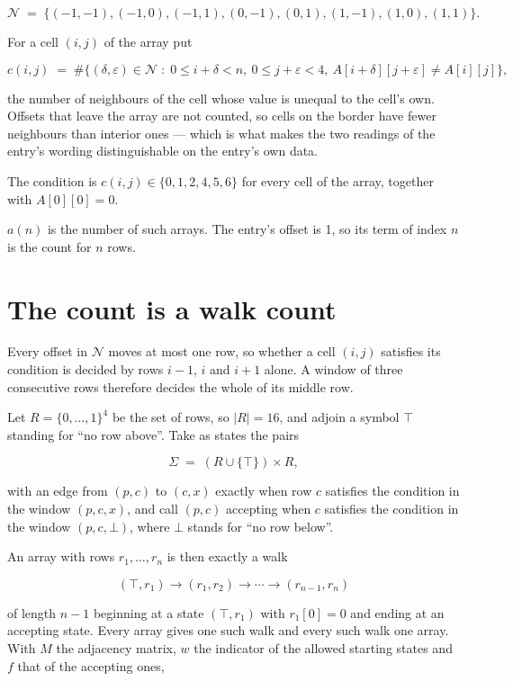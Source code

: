 \documentclass[11pt]{article}
\theoremstyle{definition}
\begin{document}
\[\mathcal{N} \;=\; \{(-1,-1), (-1,0), (-1,1), (0,-1), (0,1), (1,-1), (1,0), (1,1)\}.\]

For a cell $(i,j)$ of the array put

\[c(i,j) \;=\; \#\bigl\{(\delta,\varepsilon)\in\mathcal{N} \;:\; 0\le i+\delta<n,\ 0\le j+\varepsilon<4,\ A[i+\delta][j+\varepsilon] \neq A[i][j]\bigr\},\]

the number of neighbours of the cell whose value is unequal to the cell's own. Offsets that leave the array are not counted, so cells on the border have fewer neighbours than interior ones --- which is what makes the two readings of the entry's wording distinguishable on the entry's own data.

The condition is $c(i,j) \in \{0, 1, 2, 4, 5, 6\}$ for every cell of the array, together with $A[0][0]=0$.

$a(n)$ is the number of such arrays. The entry's offset is 1, so its term of index $n$ is the count for $n$ rows.

\section{The count is a walk count}

Every offset in $\mathcal{N}$ moves at most one row, so whether a cell $(i,j)$ satisfies its condition is decided by rows $i-1$, $i$ and $i+1$ alone. A window of three consecutive rows therefore decides the whole of its middle row.

Let $R = \{0,\dots,1\}^{4}$ be the set of rows, so $|R| = 16$, and adjoin a symbol $\top$ standing for ``no row above''. Take as states the pairs

\[\Sigma \;=\; (R \cup \{\top\}) \times R,\]

with an edge from $(p,c)$ to $(c,x)$ exactly when row $c$ satisfies the condition in the window $(p,c,x)$, and call $(p,c)$ accepting when $c$ satisfies the condition in the window $(p,c,\bot)$, where $\bot$ stands for ``no row below''.

An array with rows $r_1,\dots,r_n$ is then exactly a walk

\[(\top,r_1) \to (r_1,r_2) \to \cdots \to (r_{n-1},r_n)\]

of length $n-1$ beginning at a state $(\top,r_1)$ with $r_1[0]=0$ and ending at an accepting state. Every array gives one such walk and every such walk one array. With $M$ the adjacency matrix, $w$ the indicator of the allowed starting states and $f$ that of the accepting ones,
\end{document}

